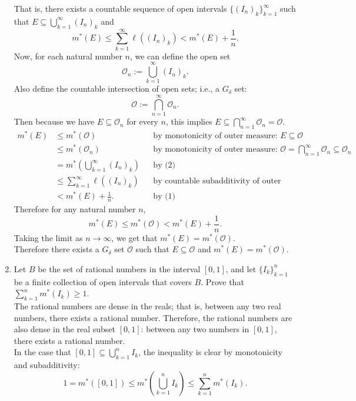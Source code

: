 \begin{enumerate}
	That is, there exists a countable sequence of open intervals $\{(I_n)_k\}_{k=1}^\infty$ such that $E\subseteq\bigcup_{k=1}^\infty (I_n)_k$ and 
	\begin{equation}
		m^*(E)\le\sum_{k=1}^\infty\ell((I_n)_k)<m^*(E)+\frac{1}{n}.\tag{1}
	\end{equation}
	Now, for each natural number $n$, we can define the open set
	\begin{equation}
		\mathcal{O}_n:=\bigcup_{k=1}^\infty (I_n)_k.\tag{2}
	\end{equation}
	Also define the countable intersection of open sets; i.e., a $G_\delta$ set:
	\[
		\mathcal{O}:=\bigcap_{n=1}^\infty\mathcal{O}_n.
	\]
	Then because we have $E\subseteq\mathcal{O}_n$ for every $n$, this implies $E\subseteq\bigcap_{n=1}^\infty\mathcal{O}_n=\mathcal{O}$.
	\begin{align*}
		m^*(E)&\le m^*(\mathcal{O})&&\text{by monotonicity of outer measure: }E\subseteq\mathcal{O}\\
		&\le m^*(\mathcal{O}_n)&&\text{by monotonicity of outer measure: }\mathcal{O}=\bigcap_{n=1}^\infty\mathcal{O}_n\subseteq\mathcal{O}_n\\
		&=m^*(\bigcup_{k=1}^\infty (I_n)_k)&&\text{by (2)}\\
		&\le\sum_{k=1}^\infty\ell((I_n)_k)&&\text{by countable subadditivity of outer measure}\\
		&<m^*(E)+\frac{1}{n}.&&\text{by (1)}
	\end{align*}
	Therefore for any natural number $n$,
	\[
		m^*(E)\le m^*(\mathcal{O})<m^*(E)+\frac{1}{n}.	
	\]
	Taking the limit as $n\to\infty$, we get that $m^*(E)= m^*(\mathcal{O})$.\\
	Therefore there exists a $G_\delta$ set $\mathcal{O}$ such that $E\subseteq \mathcal{O}$ and $m^*(E)= m^*(\mathcal{O})$.
	\item Let $B$ be the set of rational numbers in the interval $[0,1]$, and let $\{I_k\}_{k=1}^n$ be a finite collection of open intervals that covers $B$.
	Prove that $\textstyle \sum_{k=1}^n m^*(I_k) \ge 1$.\\
	The rational numbers are dense in the reals; that is, between any two real numbers, there exists a rational number.
	Therefore, the rational numbers are also dense in the real subset $[0,1]$: between any two numbers in $[0,1]$, there exists a rational number. \\
	In the case that $[0,1]\subseteq \bigcup_{k=1}^nI_k$, the inequality is clear by monotonicity and subadditivity: 
	\[
		1=m^*([0,1])\le m^*(\bigcup_{k=1}^nI_k)\le\sum_{k=1}^nm^*(I_k).
\]
\end{enumerate}
